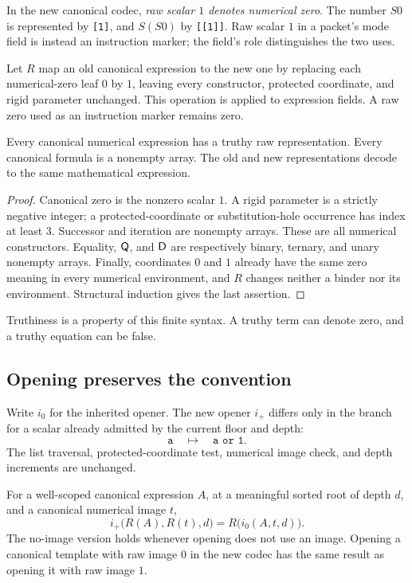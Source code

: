 In the new canonical codec, \emph{raw scalar \(1\) denotes numerical
zero}.  The number \(S0\) is represented by \texttt{[1]}, and \(S(S0)\)
by \texttt{[[1]]}.  Raw scalar \(1\) in a packet's mode field is instead
an instruction marker; the field's role distinguishes the two uses.

Let \(R\) map an old canonical expression to the new one by replacing
each numerical-zero leaf \(0\) by \(1\), leaving every constructor,
protected coordinate, and rigid parameter unchanged.  This operation
is applied to expression fields.  A raw zero used as an instruction
marker remains zero.

\begin{lemma}
\label{truthy:positive}
Every canonical numerical expression has a truthy raw representation.
Every canonical formula is a nonempty array.  The old and new
representations decode to the same mathematical expression.
\end{lemma}

\begin{proof}
Canonical zero is the nonzero scalar \(1\).  A rigid parameter is a
strictly negative integer; a protected-coordinate or substitution-hole
occurrence has index at least \(3\).  Successor and iteration are
nonempty arrays.  These are all numerical constructors.
Equality, \(\mathsf Q\), and \(\mathsf D\) are respectively binary, ternary, and
unary nonempty arrays.  Finally, coordinates \(0\) and \(1\) already
have the same zero meaning in every numerical environment, and \(R\)
changes neither a binder nor its environment.  Structural induction
gives the last assertion.
\end{proof}

Truthiness is a property of this finite syntax.  A truthy term can
denote zero, and a truthy equation can be false.

\subsection{Opening preserves the convention}

Write \(i_0\) for the inherited opener.  The new opener \(i_+\) differs
only in the branch for a scalar already admitted by the current floor
and depth:
\[
             \texttt{a}\quad\longmapsto\quad\texttt{a or 1}.
\]
The list traversal, protected-coordinate test, numerical image check,
and depth increments are unchanged.

\begin{lemma}
\label{truthy:opening}
For a well-scoped canonical expression \(A\), at a meaningful sorted
root of depth \(d\), and a canonical numerical image \(t\),
\[
 i_+\bigl(R(A),R(t),d\bigr)
       =R\bigl(i_0(A,t,d)\bigr).
 \tag{Opening commutation}\label{truthy:commute}
\]
The no-image version holds whenever opening does not use an image.
Opening a canonical template with raw image \(0\) in the new codec
has the same result as opening it with raw image \(1\).
\end{lemma}

